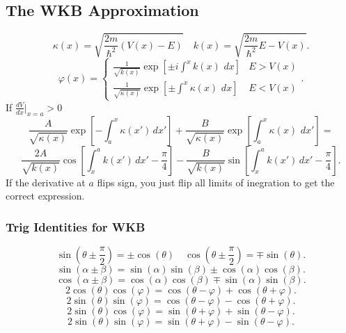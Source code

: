 \documentclass{article}
\begin{document}
  \subsection*{The WKB Approximation}
    \[
    \kappa(x) = \sqrt{\frac{2m}{\hbar^2}(V(x) - E)} \quad
    k(x) = \sqrt{\frac{2m}{\hbar^2} E - V(x)}
    .\]    
    \[
      \varphi(x) = 
      \begin{cases}
        \frac{1}{\sqrt{k(x)}} \exp[\pm i \int^x k(x)\,\,dx ]& E > V(x) \\
        \frac{1}{\sqrt{\kappa(x)}} \exp[\pm \int^x \kappa(x) \,\,dx] & E < V(x)
      \end{cases}
    .\] 
    If $\frac{d V}{dx}|_{x=a} > 0$ 
    \[
      \frac{A}{\sqrt{\kappa(x)}}\exp\left[ -\int_a^x \kappa(x')\,dx' \right] +
      \frac{B}{\sqrt{\kappa(x)}}\exp\left[\int_a^x \kappa(x)\,\,dx'\right] =
    \] 
    \[
      \frac{2A}{\sqrt{k(x)}}\cos\left[\int_x^a k(x')\,dx' - \frac{\pi}{4} \right] -
      \frac{B}{\sqrt{k(x)}}\sin\left[\int_x^a k(x')\,dx' - \frac{\pi}{4}\right]
    .\] 
    If the derivative at $a$ flips sign, you just flip all limits of inegration
    to get the correct expression.
    \subsubsection*{Trig Identities for WKB}
      \[
        \sin(\theta \pm \frac{ \pi}{2}) = \pm\cos(\theta) \quad
        \cos(\theta \pm \frac{\pi}{2}) = \mp\sin(\theta)
      .\] 
      \[
        \sin(\alpha \pm \beta) = \sin(\alpha)\sin(\beta) \pm \cos(\alpha)\cos(\beta)
      .\] 
      \[
        \cos(\alpha \pm \beta) = \cos(\alpha)\cos(\beta) \mp \sin(\alpha) \sin(\beta)
      .\] 
      \[
        2\cos(\theta)\cos(\varphi) = \cos(\theta - \varphi) + \cos(\theta + \varphi)
      .\] 
       \[
         2\sin(\theta)\sin(\varphi) = \cos(\theta - \varphi) - \cos(\theta + \varphi)
      .\] 
      \[
        2 \sin(\theta)\cos(\varphi) = \sin(\theta + \varphi) + \sin(\theta - \varphi)
      .\] 
      \[
        2\sin(\theta)\sin(\varphi) = \sin(\theta + \varphi) - \sin(\theta - \varphi)
      .\] 
\end{document}
